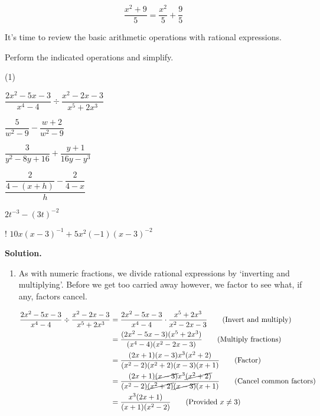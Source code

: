 \[ \dfrac{x^2+9}{5} = \dfrac{x^2}{5} + \dfrac{9}{5} \] 

It's time to review the basic arithmetic operations with rational expressions. 

\begin{ex} \label{rationalexpressionreviewex} Perform the indicated operations and simplify.

\begin{tasks}(1)

\task  $\dfrac{2x^2-5x-3}{x^4 - 4} \div \dfrac{x^2-2x-3}{x^5 + 2x^3}$

\task  $\dfrac{5}{w^2 - 9} - \dfrac{w+2}{w^2-9}$

\task  $\dfrac{3}{y^2 - 8y + 16} + \dfrac{y+1}{16y - y^3}$

\task  $\dfrac{\dfrac{2}{4 - (x+h)} - \dfrac{2}{4-x}}{h}$

\task  $2t^{-3} - (3t)^{-2}$

\task!  $10x(x-3)^{-1} + 5x^2(-1)(x-3)^{-2}$

\end{tasks}

{\bf Solution.}

\begin{enumerate}

\item As with numeric fractions, we divide rational expressions by `inverting and multiplying'.  Before we get too carried away however, we factor to see what, if any, factors cancel.

\begin{align*}
\dfrac{2x^2-5x-3}{x^4 - 4} \div \dfrac{x^2-2x-3}{x^5 + 2x^3} & = \dfrac{2x^2-5x-3}{x^4 - 4} \cdot \dfrac{x^5 + 2x^3}{x^2-2x-3} \tag{Invert and multiply} \\ 
& = \dfrac{(2x^2-5x-3)(x^5 + 2x^3)}{(x^4 - 4)(x^2-2x-3)} \tag{Multiply fractions}  \\ 
& = \dfrac{(2x+1)(x-3)x^3(x^2+2)}{(x^2-2)(x^2+2)(x-3)(x+1)} \tag{Factor} \\ 
& = \dfrac{(2x+1)\cancel{(x-3)}x^3\cancel{(x^2+2)}}{(x^2-2)\cancel{(x^2+2)}\cancel{(x-3)}(x+1)} \tag{Cancel common factors} \\ 
& = \dfrac{x^3(2x+1)}{(x+1)(x^2-2)} \tag{Provided $x \neq 3$} \\
\end{align*}


\end{enumerate}
\end{ex}
